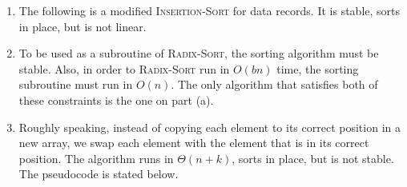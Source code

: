 \begin{enumerate}
\begin{framed}
\begin{enumerate}
{\begin{algorithm}[H]
\SetAlgoNoEnd\DontPrintSemicolon
\BlankLine
{}
\nonl{}
\end{algorithm}
}

\item{The following is a modified \textsc{Insertion-Sort} for data records. It
is stable, sorts in place, but is not linear.

\begin{algorithm}[H]
\SetAlgoNoEnd\DontPrintSemicolon
\BlankLine
{}
\nonl{}
\end{algorithm}
}

\newpage

\item{To be used as a subroutine of \textsc{Radix-Sort}, the sorting algorithm
must be stable. Also, in order to \textsc{Radix-Sort} run in $O(bn)$ time, the
sorting subroutine must run in $O(n)$. The only algorithm that satisfies both of
these constraints is the one on part (a).}

\item{Roughly speaking, instead of copying each element to its correct position
in a new array, we swap each element with the element that is in its correct
position. The algorithm runs in $\Theta(n + k)$, sorts in place, but is not
stable. The pseudocode is stated below.

\begin{algorithm}[H]
\SetAlgoNoEnd\DontPrintSemicolon
\BlankLine
{}
\nonl{}
\end{algorithm}
}


\end{enumerate}
\end{framed}
\end{enumerate}
